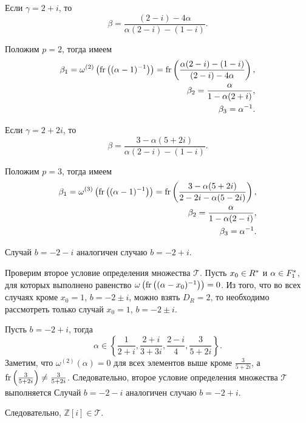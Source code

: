 \documentclass[_00_dissertation.tex]{subfiles}
\begin{document}
\begin{example}
    Если $\gamma = 2 + i$, то
    \begin{equation*}
        \beta = \frac{(2 - i) - 4\alpha}{\alpha(2 - i) - (1 - i)}.
    \end{equation*}

    Положим $p = 2$, тогда имеем
    \begin{equation*}
        \begin{split}
            \beta_1 = \omega^{(2)}\left(
                \textrm{fr}\left((\alpha-1)^{-1}\right)
            \right) = \textrm{fr}\left(\frac{\alpha(2 - i) - (1 - i)}{(2 - i) - 4\alpha}\right),\\
            \beta_2 = \frac{\alpha}{1 - \alpha(2 + i)},\\
            \beta_3 = \alpha^{-1}.
        \end{split}
    \end{equation*}

    Если $\gamma = 2 + 2i$, то
    \begin{equation*}
        \beta = \frac{3 - \alpha(5 + 2i)}{\alpha(2 - i) - (1 - i)}.
    \end{equation*}

    Положим $p = 3$, тогда имеем
    \begin{equation*}
        \begin{split}
            \beta_1 = \omega^{(3)}\left(
                \textrm{fr}\left((\alpha-1)^{-1}\right)
            \right) = \textrm{fr}\left(\frac{3 - \alpha(5 + 2i)}{2 - 2i - \alpha(5 - 2i)}\right),\\
            \beta_2 = \frac{\alpha}{1 - \alpha(2 - i)},\\
            \beta_3 = \alpha^{-1}.
        \end{split}
    \end{equation*}

    Случай $b = -2 - i$ аналогичен случаю $b = -2 + i$.

    Проверим второе условие определения множества $\mathcal{T}$.
    Пусть $x_0 \in R^{*}$ и $\alpha \in F_1^{*}$, для которых выполнено равенство $\omega\left(\textrm{fr}\left((\alpha - x_0)^{-1}\right)\right) = 0$.
    Из того, что во всех  случаях кроме $x_0 = 1$, $b = -2 \pm i$, можно взять $D_R = 2$, то необходимо рассмотреть только случай $x_0 = 1$, $b = -2 \pm i$.

    Пусть $b = -2 + i$, тогда
    \begin{equation*}
        \alpha \in \left\{
            \frac{1}{2 + i}, \frac{2 + i}{3 + 3i}, \frac{2 - i}{4}, \frac{3}{5 + 2i}
        \right\}.
    \end{equation*}
    Заметим, что $\omega^{(2)}(\alpha) = 0$ для всех элементов выше кроме $\frac{3}{5 + 2i}$, а $\textrm{fr}\left(\frac{3}{5 + 2i}\right) \neq \frac{3}{5 + 2i}$.
    Следовательно, второе условие определения множества $\mathcal{T}$ выполняется
    Случай $b = -2 - i$ аналогичен случаю $b = -2 + i$.

    Следовательно, $\mathbb{Z}[i] \in \mathcal{T}$.
\end{example}
\end{document}
